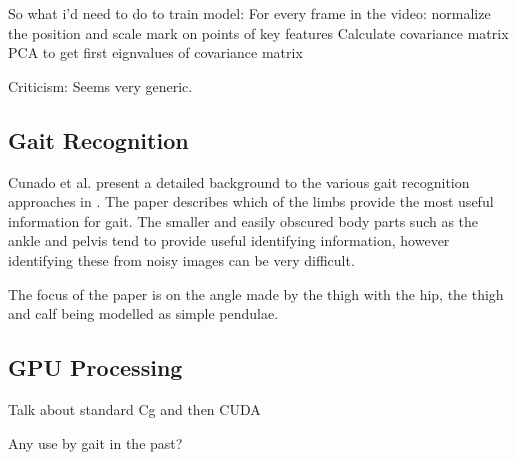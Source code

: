 So what i'd need to do to train model:
For every frame in the video:
  normalize the position and scale
  mark on points of key features
Calculate covariance matrix
PCA to get first eignvalues of covariance matrix

Criticism:
Seems very generic.

\subsection{Gait Recognition}

Cunado et al. present a detailed background to the various gait recognition approaches in \cite{GaitModels}.
The paper describes which of the limbs provide the most useful information for gait.
The smaller and easily obscured body parts such as the ankle and pelvis tend to provide useful identifying information, however identifying these from noisy images can be very difficult.

The focus of the paper is on the angle made by the thigh with the hip, the thigh and calf being modelled as simple pendulae.

\subsection{GPU Processing}

Talk about standard Cg and then CUDA

Any use by gait in the past?
